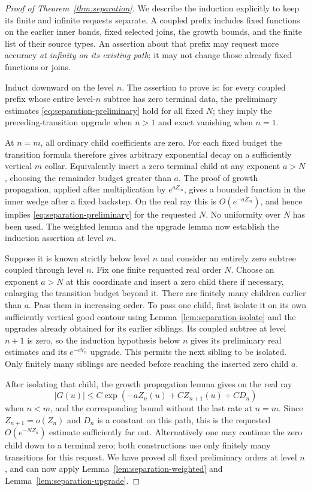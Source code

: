 \begin{proof}[Proof of Theorem~\ref{thm:separation}]
We describe the induction explicitly to keep its finite and
infinite requests separate.  A coupled prefix includes fixed
functions on the earlier inner bands, fixed selected joins,
the growth bounds, and the finite list of their source types.
An assertion about that prefix may request more accuracy
\emph{at infinity on its existing path}; it may not change
those already fixed functions or joins.

Induct downward on the level $n$.  The assertion to prove is:
for every coupled prefix whose entire level-$n$ subtree has
zero terminal data, the preliminary estimates
\eqref{eq:separation-preliminary} hold for all fixed $N$;
they imply the preceding-transition upgrade when $n>1$ and
exact vanishing when $n=1$.

At $n=m$, all ordinary child coefficients are zero.  For each
fixed budget the transition formula therefore gives arbitrary
exponential decay on a sufficiently vertical $m$ collar.
Equivalently insert a zero terminal child at any exponent
$a>N$, choosing the remainder budget greater than $a$.
The proof of growth propagation, applied after multiplication
by $e^{aZ_m}$, gives a bounded function in the inner wedge
after a fixed backstep.  On the real ray this is
$O(e^{-aZ_m})$, and hence implies
\eqref{eq:separation-preliminary} for the requested $N$.
No uniformity over $N$ has been used.  The weighted lemma and
the upgrade lemma now establish the induction assertion at
level $m$.

Suppose it is known strictly below level $n$ and consider an
entirely zero subtree coupled through level $n$.
Fix one finite requested real order $N$.  Choose an exponent
$a>N$ at this coordinate and insert a zero child there if
necessary, enlarging the transition budget beyond it.  There
are finitely many children earlier than $a$.  Pass them in
increasing order.  To pass one child, first isolate it on its
own sufficiently vertical good contour using
Lemma~\ref{lem:separation-isolate} and the upgrades already
obtained for its earlier siblings.  Its coupled subtree at
level $n+1$ is zero, so the induction hypothesis below $n$
gives its preliminary real estimates and its
$e^{-cV_n}$ upgrade.  This permits the next sibling to be
isolated.  Only finitely many siblings are needed before
reaching the inserted zero child $a$.

After isolating that child, the growth propagation lemma gives
on the real ray
\[
 |G(u)|\leq C\exp(-aZ_n(u)+CZ_{n+1}(u)+CD_n)
\]
when $n<m$, and the corresponding bound without the last
rate at $n=m$.  Since $Z_{n+1}=o(Z_n)$ and $D_n$ is a
constant on this path, this is the requested
$O(e^{-NZ_n})$ estimate sufficiently far out.  Alternatively
one may continue the zero child down to a terminal zero;
both constructions use only finitely many transitions for
this request.  We have proved all fixed preliminary orders
at level $n$, and can now apply
Lemma~\ref{lem:separation-weighted} and
Lemma~\ref{lem:separation-upgrade}.


\end{proof}
